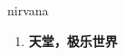 
\begin{frame}
{\huge nirvana}
\begin{center}
\begin{enumerate}\Large
  \item \textbf{天堂，极乐世界}
\end{enumerate}
\end{center}
\end{frame}
